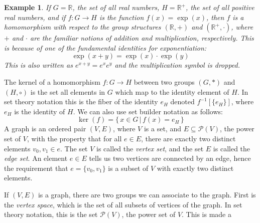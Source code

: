 \documentclass{article}
\theoremstyle{plain}
\theoremstyle{normal}
\newtheorem{example}{Example}[section]
\begin{document}
            \begin{example}
                If $G=\mathbb{R}$, the set of all real numbers,
                $H=\mathbb{R}^{+}$, the set of all positive real numbers, and
                if $f:G\rightarrow{H}$ is the function $f(x)=\exp(x)$, then
                $f$ is a homomorphism with respect to the group structures
                $(\mathbb{R},+)$ and $(\mathbb{R}^{+},\cdot)$, where
                $+$ and $\cdot$ are the familiar notions of addition and
                multiplication, respectively. This is because of one of the
                fundamental identities for exponentiation:
                \begin{equation}
                    \exp(x+y)=\exp(x)\cdot\exp(y)
                \end{equation}
                This is also written as $e^{x+y}=e^{x}e^{y}$ and the
                multiplication symbol is dropped.
            \end{example}
            The kernel of a homomorphism $f:G\rightarrow{H}$ between two
            groups $(G,*)$ and $(H,\circ)$ is the set all elements in
            $G$ which map to the identity element of $H$. In set theory
            notation this is the fiber of the identity $e_{H}$ denoted
            $f^{-1}[\{e_{H}\}]$, where $e_{H}$ is the identity of $H$. We can
            also use set builder notation as follows:
            \begin{equation}
                \ker(f)=\{\,x\in{G}\,|\,f(x)=e_{H}\,\}
            \end{equation}
            A graph is an ordered pair $(V,E)$, where $V$ is a set, and
            $E\subseteq\mathcal{P}(V)$, the power set of $V$, with the property
            that for all $e\in{E}$, there are exactly two distinct elements
            $v_{0},v_{1}\in{e}$. The set $V$ is called the \textit{vertex set},
            and the set $E$ is called the \textit{edge set}. An element
            $e\in{E}$ tells us two vertices are connected by an edge, hence
            the requirement that $e=\{v_{0},v_{1}\}$ is a subset of $V$ with
            exactly two distinct elements.
            \par\hfill\par
            If $(V,E)$ is a graph, there are two groups we can associate to the
            graph. First is the \textit{vertex space}, which is the set of
            all subsets of vertices of the graph. In set theory notation, this
            is the set $\mathcal{P}(V)$, the power set of $V$. This is made a
\end{document}
